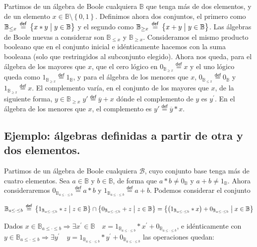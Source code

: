 \documentclass[final,12pt,a4paper,twoside,fleqn]{extbook}
\newcommand{\mathdef}{\ensuremath{\stackrel{\mathsf{def}}{{}={}}}}
\newcommand{\set}[1]{\ensuremath{\left\lbrace{#1}\right\rbrace}}
\newcommand {\setCompr}[2]{
	\ensuremath{
		\left\lbrace{ 
			#1 {\;\big{\vert}\;} #2
        }\right\rbrace
    }
}
\newcommand{\setB}{\ensuremath{\mathbb{B}}}
\newcommand{\algB}{\ensuremath{\mathscr{B}}}
\theoremstyle{definition}
\theoremstyle{remark}
\begin{document}
	Partimos de un álgebra de Boole cualquiera \(\setB\) que tenga más de dos
elementos, y de un elemento \(x \in \setB\setminus\set{0,1} \). Definimos
ahora dos conjuntos, el primero como \({\setB}_{\leq x} \mathdef \setCompr{x
* y}{y \in \setB}\) y el segundo como \({\setB}_{\geq x} \mathdef
\setCompr{x + y}{y \in \setB}\). Las álgebras de Boole nuevas a considerar
son \({\setB}_{\leq x}\) y \({\setB}_{\geq x}\). Consideramos el mismo
producto booleano que en el conjunto inicial e idénticamente hacemos con la
suma booleana (solo que restringidos al subconjunto elegido). Ahora nos
queda, para el álgebra de los mayores que \(x\), que el cero lógico en
\(0_{{\setB}_{\geq x}} \mathdef x\) y el uno lógico queda como
\(1_{{\setB}_{\geq x}} \mathdef 1_{\setB}\), y para el álgebra de los menores
que \(x\), \(0_{{\setB}_{\leq x}} \mathdef 0_{\setB}\) y \(1_{{\setB}_{\geq
x}} \mathdef x\). El complemento varía, en el conjunto de los mayores que
\(x\), de la siguiente forma, \(y \in {\setB}_{\geq x} \; y' \mathdef
\overline{y} + x\) dónde el complemento de \(y\) es \(y^\prime\). En el
álgebra de los menores que \(x\), el complemento es \(y' \mathdef
\overline{y} * x\).



\subsection{Ejemplo: álgebras definidas a partir de otra y dos elementos.}



	Partimos de un álgebra de Boole cualquiera \(\algB\), cuyo conjunto base
tenga más de cuatro elementos. Sea \(a\in\setB\) y \(b\in\setB\), de forma
que \(a * b \neq 0_{\setB}\) y \(a + b \neq 1_{\setB}\). Ahora consideraremos
\(0_{\setB_{ a \leq \cdot \leq b} } \mathdef a * b \) y \( 1_{ \setB_{a
\leq \cdot \leq b}} \mathdef a + b\). Podemos considerar el conjunto 



\begin{equation}
{\setB}_{a\leq \cdot\leq b} 
\mathdef 
	\setCompr{ 
		1_{\setB_{a\leq\cdot\leq b}} * z
		}
		{z \in \setB} 
	\cap 
	\setCompr{
		0_{\setB_{a\leq\cdot\leq b}} + z
		}
		{z \in \setB}
=
	\setCompr{
		\left({1_{\setB_{a\leq\cdot\leq b}}}* x\right)
		+{0_{\setB_{a\leq\cdot\leq b}}}
	}
	{
		x \in \setB
	}
\end{equation}



Dados 
\(
x \in \setB_{a \leq \cdot \leq b}
\Rightarrow 
\exists x^{\prime} \in \setB
\quad 
x = 1_{\setB_{a \leq \cdot \leq b}} * x^{\prime} + 0_{\setB_{a \leq
\cdot \leq b}} 
\), e idénticamente con
\(
y \in \setB_{a \leq \cdot \leq b} 
\Rightarrow 
\exists y^{\prime} 
\quad 
y = 1_{\setB_{a \leq \cdot \leq b}} * y^{\prime} + 0_{\setB_{a \leq
\cdot
\leq b}} \) las operaciones quedan:
\end{document}
